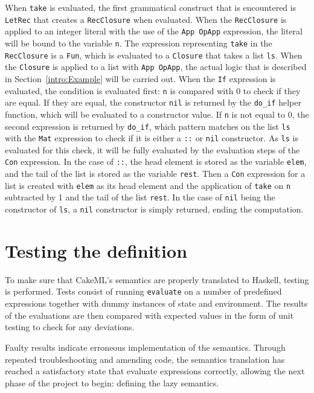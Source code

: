 When \texttt{take} is evaluated, the first grammatical construct that is
encountered is \texttt{LetRec} that creates a \texttt{RecClosure} when evaluated.
When the \texttt{RecClosure} is applied to an integer literal with the use of the
\texttt{App OpApp} expression, the literal will be bound to the variable \texttt{n}.
The expression representing \texttt{take} in the \texttt{RecClosure} is a
\texttt{Fun}, which is evaluated to a \texttt{Closure} that takes a list
\texttt{ls}. When the \texttt{Closure} is applied to a list with \texttt{App OpApp},
the actual logic that is described in
Section~\ref{intro:Example} will be carried out. When the \texttt{If} expression
is evaluated, the condition is evaluated first: \texttt{n} is compared with 0 to
check if they are equal. If they are equal, the constructor \texttt{nil} is
returned by the \texttt{do\_if} helper function, which will
be evaluated to a constructor value.
If \texttt{n} is not equal to 0, the second expression is returned by
\texttt{do\_if}, which pattern matches on the list \texttt{ls} with the
\texttt{Mat} expression to check if it is
either a \texttt{::} or \texttt{nil} constructor. As \texttt{ls} is evaluated
for this check, it will be fully evaluated by the evaluation steps of the
\texttt{Con} expression.
In the case of \texttt{::},
the head element is stored as the variable \texttt{elem}, and the tail of the
list is stored as the variable \texttt{rest}. Then a \texttt{Con} expression
for a list is created with \texttt{elem} as its head element and the application
of \texttt{take} on \texttt{n} subtracted by 1 and the tail of the list
\texttt{rest}. In the case of \texttt{nil} being the constructor of \texttt{ls},
a \texttt{nil} constructor is simply returned, ending the computation.


\section{Testing the definition}
To make sure that CakeML's semantics are properly translated to Haskell, testing
is performed.
Tests consist of running \texttt{evaluate} on a number of predefined
expressions together with dummy instances of state and environment.
The results of the evaluations are then compared with expected values
in the form of unit testing to check for any deviations.

Faulty results indicate erroneous implementation of the semantics.
Through repeated troubleshooting and amending code, the semantics translation
has reached a satisfactory state that evaluate expressions correctly,
allowing the next phase of the project to begin: defining the lazy semantics.
